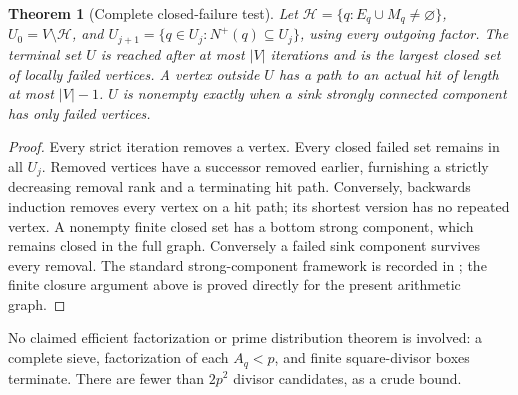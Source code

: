 \documentclass[10pt,a4paper]{article}
\newtheorem{theorem}{Theorem}
\begin{document}
\begin{theorem}[Complete closed-failure test]
Let $\mathscr H=\{q:E_q\cup M_q\ne\varnothing\}$, $U_0=V\setminus\mathscr H$,
and $U_{j+1}=\{q\in U_j:N^+(q)\subseteq U_j\}$, using every outgoing factor.
The terminal set $U$ is reached after at most $|V|$ iterations and is the
largest closed set of locally failed vertices. A vertex outside $U$ has a path
to an actual hit of length at most $|V|-1$. $U$ is nonempty exactly when a sink
strongly connected component has only failed vertices.
\end{theorem}
\begin{proof}
Every strict iteration removes a vertex. Every closed failed set remains in
all $U_j$. Removed vertices have a successor removed earlier, furnishing a
strictly decreasing removal rank and a terminating hit path. Conversely,
backwards induction removes every vertex on a hit path; its shortest version
has no repeated vertex. A nonempty finite closed set has a bottom strong
 component, which remains closed in the full graph. Conversely a failed sink
 component survives every removal. The standard strong-component framework is
 recorded in \cite[Theorems 3.10 and 5.2]{Tarjan}; the finite closure argument
 above is proved directly for the present arithmetic graph.
\end{proof}
No claimed efficient factorization or prime distribution theorem is involved:
a complete sieve, factorization of each $A_q<p$, and finite square-divisor boxes
terminate. There are fewer than $2p^2$ divisor candidates, as a crude bound.
\end{document}

